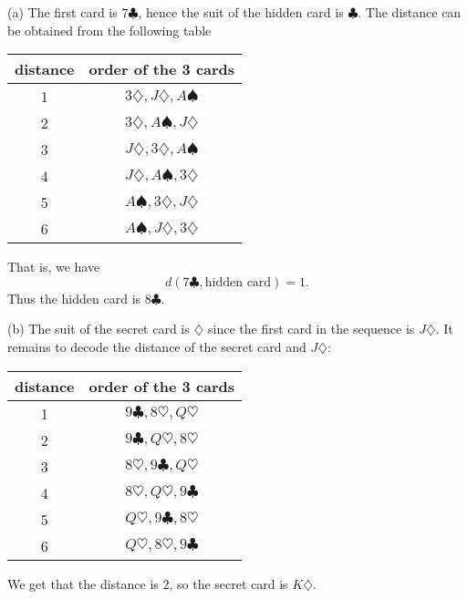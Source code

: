 \begin{enumerate}
(a) The first card is $7\clubsuit$, hence the suit of the hidden card is $\clubsuit$. The distance can be obtained from the following table
\begin{center}
\begin{tabular}{|c|c|}
\hline
distance & order of the 3 cards\\
\hline
1 & $3\diamondsuit,J\diamondsuit,A\spadesuit$\\
\hline
2 & $3\diamondsuit,A\spadesuit,J\diamondsuit$\\
\hline
3 & $J\diamondsuit,3\diamondsuit,A\spadesuit$\\
\hline
4 & $J\diamondsuit,A\spadesuit,3\diamondsuit$\\
\hline
5 & $A\spadesuit,3\diamondsuit,J\diamondsuit$\\
\hline
6 & $A\spadesuit,J\diamondsuit,3\diamondsuit$\\
\hline
\end{tabular}
\end{center}
That is, we have 
$$
d(7\clubsuit,\mbox{hidden card})=1.
$$
Thus the hidden card is $8\clubsuit$.

(b) The suit of the secret card is $\diamondsuit$ since the first card in the sequence is $J\diamondsuit$.
It remains to decode the distance of the secret card and $J\diamondsuit:$
\begin{center}
\begin{tabular}{|c|c|}
\hline
distance & order of the 3 cards\\
\hline
1 & $9\clubsuit,8\heartsuit,Q\heartsuit$\\
\hline
2 & $9\clubsuit,Q\heartsuit,8\heartsuit$\\
\hline
3 & $8\heartsuit,9\clubsuit,Q\heartsuit$\\
\hline
4 & $8\heartsuit,Q\heartsuit,9\clubsuit$\\
\hline
5 & $Q\heartsuit,9\clubsuit,8\heartsuit$\\
\hline
6 & $Q\heartsuit,8\heartsuit,9\clubsuit$\\
\hline
\end{tabular}
\end{center}
We get that the distance is 2, so the secret card is $K\diamondsuit$.


\end{enumerate}
